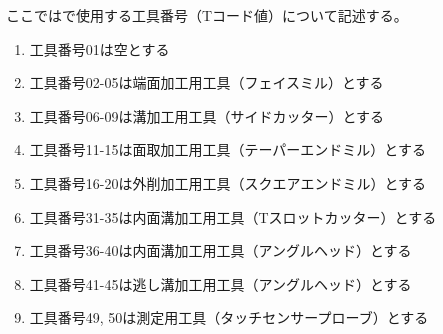 


ここでは\DMname で使用する工具番号（Tコード値）について記述する。
\begin{enumerate}[label=\Roman*), ref=\Roman*)]
\item 工具番号01は空とする
\item 工具番号02-05は端面加工用工具（フェイスミル）とする
\item 工具番号06-09は溝加工用工具（サイドカッター）とする
\item 工具番号11-15は面取加工用工具（テーパーエンドミル）とする
\item 工具番号16-20は外削加工用工具（スクエアエンドミル）とする
\item 工具番号31-35は内面溝加工用工具（Tスロットカッター）とする
\item 工具番号36-40は内面溝加工用工具（アングルヘッド）とする
\item 工具番号41-45は逃し溝加工用工具（アングルヘッド）とする
\item 工具番号49, 50は測定用工具（タッチセンサープローブ）とする
\end{enumerate}



